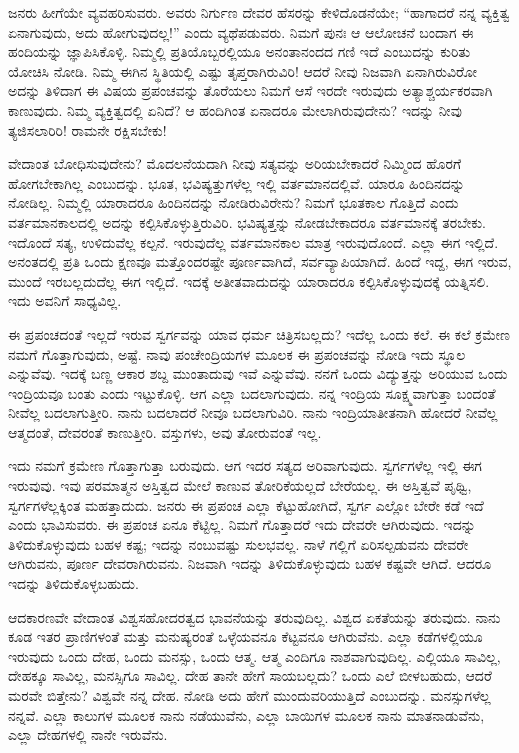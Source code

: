 ಜನರು ಹೀಗೆಯೇ ವ್ಯವಹರಿಸುವರು. ಅವರು ನಿರ್ಗುಣ ದೇವರ ಹೆಸರನ್ನು ಕೇಳಿದೊಡನೆಯೇ; “ಹಾಗಾದರೆ ನನ್ನ ವ್ಯಕ್ತಿತ್ವ ಏನಾಗುವುದು, ಅದು ಹೋಗುವುದಲ್ಲ!'' ಎಂದು ವ್ಯಥೆಪಡುವರು. ನಿಮಗೆ ಪುನಃ ಆ ಆಲೋಚನೆ ಬಂದಾಗ ಈ ಹಂದಿಯನ್ನು ಜ್ಞಾಪಿಸಿಕೊಳ್ಳಿ. ನಿಮ್ಮಲ್ಲಿ ಪ್ರತಿಯೊಬ್ಬರಲ್ಲಿಯೂ ಅನಂತಾನಂದದ ಗಣಿ ಇದೆ ಎಂಬುದನ್ನು ಕುರಿತು ಯೋಚಿಸಿ ನೋಡಿ. ನಿಮ್ಮ ಈಗಿನ ಸ್ಥಿತಿಯಲ್ಲಿ ಎಷ್ಟು ತೃಪ್ತರಾಗಿರುವಿರಿ! ಆದರೆ ನೀವು ನಿಜವಾಗಿ ಏನಾಗಿರುವಿರೋ ಅದನ್ನು ತಿಳಿದಾಗ ಈ ವಿಷಯ ಪ್ರಪಂಚವನ್ನು ತೊರೆಯಲು ನಿಮಗೆ ಆಸೆ ಇರದೇ ಇರುವುದು ಅತ್ಯಾಶ್ಚರ್ಯಕರವಾಗಿ ಕಾಣುವುದು. ನಿಮ್ಮ ವ್ಯಕ್ತಿತ್ವದಲ್ಲಿ ಏನಿದೆ? ಆ ಹಂದಿಗಿಂತ ಏನಾದರೂ ಮೇಲಾಗಿರುವುದೇನು? ಇದನ್ನು ನೀವು ತ್ಯಜಿಸಲಾರಿರಿ! ರಾಮನೇ ರಕ್ಷಿಸಬೇಕು!

ವೇದಾಂತ ಬೋಧಿಸುವುದೇನು? ಮೊದಲನೆಯದಾಗಿ ನೀವು ಸತ್ಯವನ್ನು ಅರಿಯಬೇಕಾದರೆ ನಿಮ್ಮಿಂದ ಹೊರಗೆ ಹೋಗಬೇಕಾಗಿಲ್ಲ ಎಂಬುದನ್ನು. ಭೂತ, ಭವಿಷ್ಯತ್ತುಗಳೆಲ್ಲ ಇಲ್ಲಿ ವರ್ತಮಾನದಲ್ಲಿವೆ. ಯಾರೂ ಹಿಂದಿನದನ್ನು ನೋಡಿಲ್ಲ. ನಿಮ್ಮಲ್ಲಿ ಯಾರಾದರೂ ಹಿಂದಿನದನ್ನು ನೋಡಿರುವಿರೇನು? ನಿಮಗೆ ಭೂತಕಾಲ ಗೊತ್ತಿದೆ ಎಂದು ವರ್ತಮಾನಕಾಲದಲ್ಲಿ ಅದನ್ನು ಕಲ್ಪಿಸಿಕೊಳ್ಳುತ್ತಿರುವಿರಿ. ಭವಿಷ್ಯತ್ತನ್ನು ನೋಡಬೇಕಾದರೂ ವರ್ತಮಾನಕ್ಕೆ ತರಬೇಕು. ಇದೊಂದೆ ಸತ್ಯ, ಉಳಿದುವೆಲ್ಲ ಕಲ್ಪನೆ. ಇರುವುದೆಲ್ಲ ವರ್ತಮಾನಕಾಲ ಮಾತ್ರ ಇರುವುದೊಂದೆ. ಎಲ್ಲಾ ಈಗ ಇಲ್ಲಿದೆ. ಅನಂತದಲ್ಲಿ ಪ್ರತಿ ಒಂದು ಕ್ಷಣವೂ ಮತ್ತೊಂದರಷ್ಟೇ ಪೂರ್ಣವಾಗಿದೆ, ಸರ್ವವ್ಯಾಪಿಯಾಗಿದೆ. ಹಿಂದೆ ಇದ್ದ, ಈಗ ಇರುವ, ಮುಂದೆ ಇರಬಲ್ಲದುದೆಲ್ಲ ಈಗ ಇಲ್ಲಿದೆ. ಇದಕ್ಕೆ ಅತೀತವಾದುದನ್ನು ಯಾರಾದರೂ ಕಲ್ಪಿಸಿಕೊಳ್ಳುವುದಕ್ಕೆ ಯತ್ನಿಸಲಿ. ಇದು ಅವನಿಗೆ ಸಾಧ್ಯವಿಲ್ಲ.

ಈ ಪ್ರಪಂಚದಂತೆ ಇಲ್ಲದೆ ಇರುವ ಸ್ವರ್ಗವನ್ನು ಯಾವ ಧರ್ಮ ಚಿತ್ರಿಸಬಲ್ಲದು? ಇದೆಲ್ಲ ಒಂದು ಕಲೆ. ಈ ಕಲೆ ಕ್ರಮೇಣ ನಮಗೆ ಗೊತ್ತಾಗುವುದು, ಅಷ್ಟೆ. ನಾವು ಪಂಚೇಂದ್ರಿಯಗಳ ಮೂಲಕ ಈ ಪ್ರಪಂಚವನ್ನು ನೋಡಿ ಇದು ಸ್ಥೂಲ ಎನ್ನುವೆವು. ಇದಕ್ಕೆ ಬಣ್ಣ ಆಕಾರ ಶಬ್ದ ಮುಂತಾದುವು ಇವೆ ಎನ್ನುವೆವು. ನನಗೆ ಒಂದು ವಿದ್ಯುತ್ತನ್ನು ಅರಿಯುವ ಒಂದು ಇಂದ್ರಿಯವೂ ಬಂತು ಎಂದು ಇಟ್ಟುಕೊಳ್ಳಿ. ಆಗ ಎಲ್ಲಾ ಬದಲಾಗುವುದು. ನನ್ನ ಇಂದ್ರಿಯ ಸೂಕ್ಷ್ಮವಾಗುತ್ತಾ ಬಂದಂತೆ ನೀವೆಲ್ಲ ಬದಲಾಗುತ್ತೀರಿ. ನಾನು ಬದಲಾದರೆ ನೀವೂ ಬದಲಾಗುವಿರಿ. ನಾನು ಇಂದ್ರಿಯಾತೀತನಾಗಿ ಹೋದರೆ ನೀವೆಲ್ಲ ಆತ್ಮದಂತೆ, ದೇವರಂತೆ ಕಾಣುತ್ತೀರಿ. ವಸ್ತುಗಳು, ಅವು ತೋರುವಂತೆ ಇಲ್ಲ.

ಇದು ನಮಗೆ ಕ್ರಮೇಣ ಗೊತ್ತಾಗುತ್ತಾ ಬರುವುದು. ಆಗ ಇದರ ಸತ್ಯದ ಅರಿವಾಗುವುದು. ಸ್ವರ್ಗಗಳೆಲ್ಲ ಇಲ್ಲಿ ಈಗ ಇರುವುವು. ಇವು ಪರಮಾತ್ಮನ ಅಸ್ತಿತ್ವದ ಮೇಲೆ ಕಾಣುವ ತೋರಿಕೆಯಲ್ಲದೆ ಬೇರೆಯಲ್ಲ. ಈ ಅಸ್ತಿತ್ವವೆ ಪೃಥ್ವಿ, ಸ್ವರ್ಗಗಳೆಲ್ಲಕ್ಕಿಂತ ಮಹತ್ತಾದುದು. ಜನರು ಈ ಪ್ರಪಂಚ ಎಲ್ಲಾ ಕೆಟ್ಟುಹೋಗಿದೆ, ಸ್ವರ್ಗ ಎಲ್ಲೋ ಬೇರೇ ಕಡೆ ಇದೆ ಎಂದು ಭಾವಿಸುವರು. ಈ ಪ್ರಪಂಚ ಏನೂ ಕೆಟ್ಟಿಲ್ಲ. ನಿಮಗೆ ಗೊತ್ತಾದರೆ ಇದು ದೇವರೇ ಆಗಿರುವುದು. ಇದನ್ನು ತಿಳಿದುಕೊಳ್ಳುವುದು ಬಹಳ ಕಷ್ಟ; ಇದನ್ನು ನಂಬುವಷ್ಟು ಸುಲಭವಲ್ಲ. ನಾಳೆ ಗಲ್ಲಿಗೆ ಏರಿಸಲ್ಪಡುವನು ದೇವರೇ ಆಗಿರುವನು, ಪೂರ್ಣ ದೇವರಾಗಿರುವನು. ನಿಜವಾಗಿ ಇದನ್ನು ತಿಳಿದುಕೊಳ್ಳುವುದು ಬಹಳ ಕಷ್ಟವೇ ಆಗಿದೆ. ಆದರೂ ಇದನ್ನು ತಿಳಿದುಕೊಳ್ಳಬಹುದು.

ಆದಕಾರಣವೇ ವೇದಾಂತ ವಿಶ್ವಸಹೋದರತ್ವದ ಭಾವನೆಯನ್ನು ತರುವುದಿಲ್ಲ. ವಿಶ್ವದ ಏಕತೆಯನ್ನು ತರುವುದು. ನಾನು ಕೂಡ ಇತರ ಪ್ರಾಣಿಗಳಂತೆ ಮತ್ತು ಮನುಷ್ಯರಂತೆ ಒಳ್ಳೆಯವನೂ ಕೆಟ್ಟವನೂ ಆಗಿರುವೆನು. ಎಲ್ಲಾ ಕಡೆಗಳಲ್ಲಿಯೂ ಇರುವುದು ಒಂದು ದೇಹ, ಒಂದು ಮನಸ್ಸು, ಒಂದು ಆತ್ಮ. ಆತ್ಮ ಎಂದಿಗೂ ನಾಶವಾಗುವುದಿಲ್ಲ. ಎಲ್ಲಿಯೂ ಸಾವಿಲ್ಲ, ದೇಹಕ್ಕೂ ಸಾವಿಲ್ಲ, ಮನಸ್ಸಿಗೂ ಸಾವಿಲ್ಲ. ದೇಹ ತಾನೇ ಹೇಗೆ ಸಾಯಬಲ್ಲದು? ಒಂದು ಎಲೆ ಬೀಳಬಹುದು, ಆದರೆ ಮರವೇ ಬಿತ್ತೇನು? ವಿಶ್ವವೇ ನನ್ನ ದೇಹ. ನೋಡಿ ಅದು ಹೇಗೆ ಮುಂದುವರಿಯುತ್ತಿದೆ ಎಂಬುದನ್ನು. ಮನಸ್ಸುಗಳೆಲ್ಲ ನನ್ನವೆ. ಎಲ್ಲಾ ಕಾಲುಗಳ ಮೂಲಕ ನಾನು ನಡೆಯುವೆನು, ಎಲ್ಲಾ ಬಾಯಿಗಳ ಮೂಲಕ ನಾನು ಮಾತನಾಡುವೆನು, ಎಲ್ಲಾ ದೇಹಗಳಲ್ಲಿ ನಾನೇ ಇರುವೆನು.


